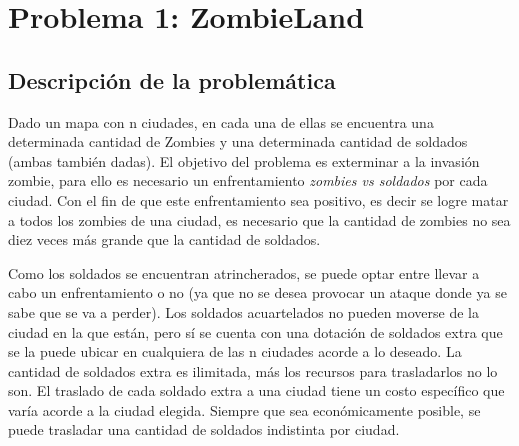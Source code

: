 \documentclass[a4paper]{article}
\begin{document}
\thispagestyle{empty}


\maketitle
\newpage

\thispagestyle{empty}
\vfill
\begin{abstract}
Habi\'endonos sido dado una serie de tres problem\'aticas a resolver, se plantean sus respectivas soluciones acorde a los requisitos pedidos. Se adjunta una descripci\'on de cada problema y su soluci\'on, conjunto a su an\'alisis de correctitud y de complejidad sumado a su experimentaci\'on. El lenguaje elegido para llevar a cabo el trabajo es C++.
\end{abstract}

\thispagestyle{empty}
\vspace{3cm}
\tableofcontents
\newpage


\newpage

\section{Problema 1: ZombieLand}
\subsection{Descripci\'on de la problem\'atica}

Dado un mapa con n ciudades, en cada una de ellas se encuentra una determinada cantidad de Zombies y una determinada cantidad de soldados (ambas tambi\'en dadas). El objetivo del problema es exterminar a la invasi\'on zombie, para ello es necesario un enfrentamiento \textit{zombies vs soldados} por cada ciudad. Con el fin de que este enfrentamiento sea positivo, es decir se logre matar a todos los zombies de una ciudad, es necesario que la cantidad de zombies no sea diez veces m\'as grande que la cantidad de soldados.

Como los soldados se encuentran atrincherados, se puede optar entre llevar a cabo un enfrentamiento o no (ya que no se desea provocar un ataque donde ya se sabe que se va a perder). Los soldados acuartelados no pueden moverse de la ciudad en la que est\'an, pero s\'i se cuenta con una dotaci\'on de soldados extra que se la puede ubicar en cualquiera de las n ciudades acorde a lo deseado. La cantidad de soldados extra es ilimitada, m\'as los recursos para trasladarlos no lo son. El traslado de cada soldado extra a una ciudad tiene un costo espec\'ifico que var\'ia acorde a la ciudad elegida. Siempre que sea econ\'omicamente posible, se puede trasladar una cantidad de soldados indistinta por ciudad.\\
\end{document}
